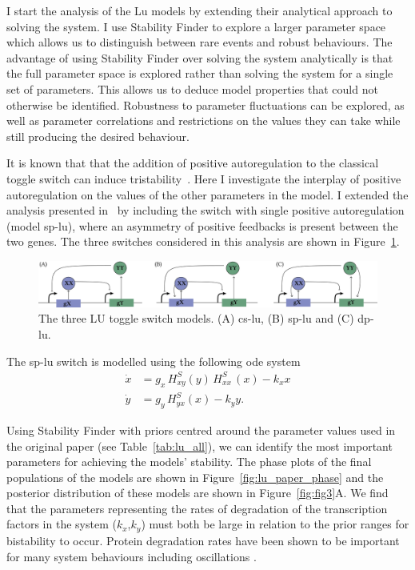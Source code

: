 I start the analysis of the Lu models by extending their analytical approach to solving the system. I use Stability Finder to explore a larger parameter space which allows us to distinguish between rare events and robust behaviours. The advantage of using Stability Finder over solving the system analytically is that the full parameter space is explored rather than solving the system for a single set of parameters. This allows us to deduce model properties that could not otherwise be identified. Robustness to parameter fluctuations can be explored, as well as parameter correlations and restrictions on the values they can take while still producing the desired behaviour. 

It is known that that the addition of positive autoregulation to the classical toggle switch can induce tristability~\autocite{Lu:2014kc}. Here I investigate the interplay of positive autoregulation on the values of the other parameters in the model. I extended the analysis presented in~\textcite{Lu:2014kc} by including the switch with single positive autoregulation (model \acrshort{sp-lu}), where an asymmetry of positive feedbacks is present between the two genes. The three switches considered in this analysis are shown in Figure~\ref{fig:lu_mods}.  


\begin{figure}[tb]
\begin{center}
	\includegraphics[width=\textwidth]{../../chapters/chapterStabilityFinder/images/LU_diagrams.png}
	\caption[The three Lu toggle switch models.]{\label{fig:lu_mods} The three LU toggle switch models. (A) \acrshort{cs-lu}, (B) \acrshort{sp-lu} and (C) \acrshort{dp-lu}.   }
\end{center}
\end{figure}


The \acrshort{sp-lu} switch is modelled using the following \acrshort{ode} system
\begin{align}
\dot{x} & = g_{x}\, H^{S}_{xy}(y)\, H^{S}_{xx}\,(x)-k_{x}x \\
\dot{y} & = g_{y}\,H^{S}_{yx}(x) - k_{y}y.
\end{align}


Using Stability Finder with priors centred around the parameter values used in the original paper (see Table~\ref{tab:lu_all}), we can identify the most important parameters for achieving the models' stability. The phase plots of the final populations of the models are shown in Figure~\ref{fig:lu_paper_phase} and the posterior distribution of these models are shown in Figure~\ref{fig:fig3}A. We find that the parameters representing the rates of degradation of the transcription factors in the system ($k_x$,$k_y$) must both be large in relation to the prior ranges for bistability to occur. Protein degradation rates have been shown to be important for many system behaviours including oscillations \autocite{Woods:2015vu}.

